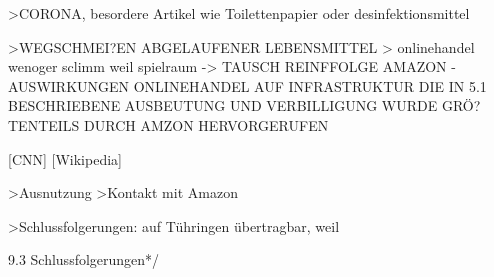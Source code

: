 >CORONA, besordere Artikel wie Toilettenpapier oder desinfektionsmittel

>WEGSCHMEI?EN ABGELAUFENER LEBENSMITTEL > onlinehandel wenoger sclimm weil spielraum
-> TAUSCH REINFFOLGE   AMAZON - AUSWIRKUNGEN ONLINEHANDEL AUF INFRASTRUKTUR
DIE IN 5.1 BESCHRIEBENE AUSBEUTUNG UND VERBILLIGUNG WURDE GRÖ?TENTEILS DURCH AMZON HERVORGERUFEN


[CNN]
[Wikipedia]

>Ausnutzung
>Kontakt mit Amazon

>Schlussfolgerungen: auf Tühringen übertragbar, weil 

9.3 Schlussfolgerungen*/
